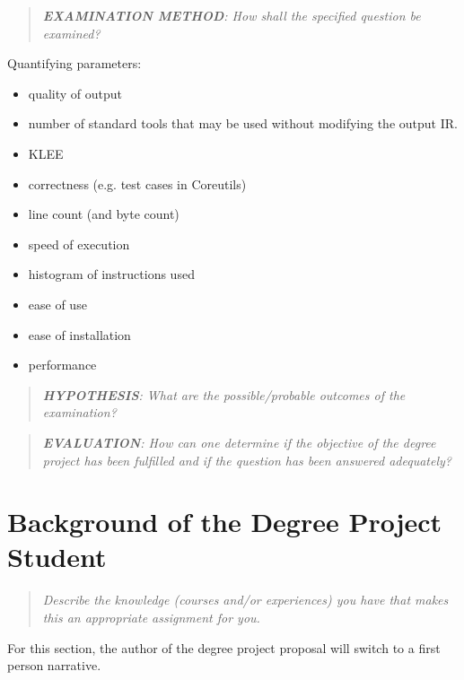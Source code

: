 \documentclass[12pt, a4paper]{article}
\begin{document}

\begin{quote}
	\textit{\textbf{EXAMINATION METHOD}: How shall the specified question be examined?}
\end{quote}


Quantifying parameters:
\begin{itemize}
	\item quality of output
		\item number of standard tools that may be used without modifying the output IR.
			\item KLEE
		\item correctness (e.g. test cases in Coreutils)
		\item line count (and byte count)
		\item speed of execution
		\item histogram of instructions used
	\item ease of use
	\item ease of installation
	\item performance
\end{itemize}

\begin{quote}
	\textit{\textbf{HYPOTHESIS}: What are the possible/probable outcomes of the examination?}
\end{quote}


\begin{quote}
	\textit{\textbf{EVALUATION}: How can one determine if the objective of the degree project has been fulfilled and if the question has been answered adequately?}
\end{quote}


\section{Background of the Degree Project Student}

\begin{quote}
	\textit{\textit{Describe the knowledge (courses and/or experiences) you have that makes this an appropriate assignment for you.}}
\end{quote}

For this section, the author of the degree project proposal will switch to a first person narrative.
\end{document}
